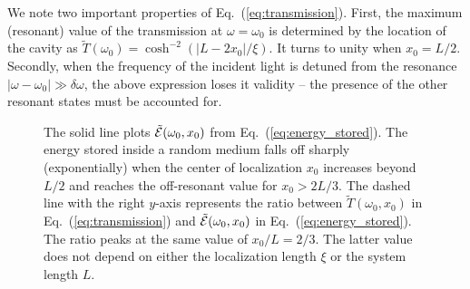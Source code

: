 We note two important properties of Eq.~(\ref{eq:transmission}). First, the maximum (resonant) value of the transmission at $\omega =\omega_0$ is determined by the location of the cavity as $\tilde{T}(\omega_0)=\cosh^{-2}\left(\left|L-2x_0\right|/\xi\right)$. It turns to unity when $x_0=L/2$. Secondly, when the frequency of the incident light is detuned from the resonance $\left|\omega-\omega_0\right|\gg\delta\omega$, the above expression loses it validity -- the presence of the other resonant states must be accounted for.

\begin{figure}
\centerline{}
\caption[The solid line plots $\tilde{\cal E}(\omega_0,x_0)$ from Eq.~(\ref{eq:energy_stored}).]{The solid line plots $\tilde{\cal E}(\omega_0,x_0)$ from Eq.~(\ref{eq:energy_stored}). The energy stored inside a random medium falls off sharply (exponentially) when the center of localization $x_0$ increases beyond $L/2$ and reaches the off-resonant value for $x_0>2L/3$. The dashed line with the right $y$-axis represents the ratio between $\tilde{T}(\omega_0,x_0)$ in Eq.~(\ref{eq:transmission}) and  $\tilde{\cal E}(\omega_0,x_0)$ in Eq.~(\ref{eq:energy_stored}). The ratio peaks at the same value of $x_0/L=2/3$. The latter value does not depend on either the localization length $\xi$ or the system length $L$. \label{fig:energydistrib}}
\end{figure}


